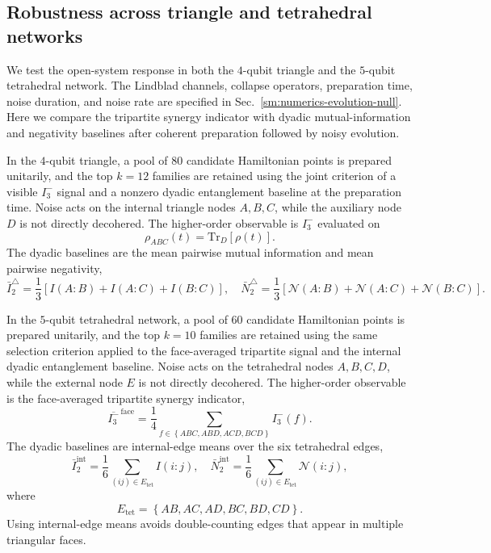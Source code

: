 \documentclass[aps,physrev,preprint,groupedaddress]{revtex4-2}
\begin{document}
\subsection{Robustness across triangle and tetrahedral networks}\label{sm:open-system-geometries}
We test the open-system response in both the $4$-qubit triangle and the $5$-qubit tetrahedral network. The Lindblad channels, collapse operators, preparation time, noise duration, and noise rate are specified in Sec.~\ref{sm:numerics-evolution-null}. Here we compare the tripartite synergy indicator with dyadic mutual-information and negativity baselines after coherent preparation followed by noisy evolution.

In the $4$-qubit triangle, a pool of $80$ candidate Hamiltonian points is prepared unitarily, and the top $k=12$ families are retained using the joint criterion of a visible $I_3^-$ signal and a nonzero dyadic entanglement baseline at the preparation time. Noise acts on the internal triangle nodes $A,B,C$, while the auxiliary node $D$ is not directly decohered. The higher-order observable is $I_3^-$ evaluated on
\begin{equation}
    \rho_{ABC}(t)={\mathrm{Tr}}_D[\rho(t)].
\end{equation}
The dyadic baselines are the mean pairwise mutual information and mean pairwise negativity,
\begin{equation}
    \bar{I}_2^{\triangle} = \frac{1}{3}[I(A:B)+I(A:C)+I(B:C)],
    \quad
    \bar{N}_2^{\triangle} = \frac{1}{3}[\mathcal{N}(A:B)+\mathcal{N}(A:C)+\mathcal{N}(B:C)].
\end{equation}

In the $5$-qubit tetrahedral network, a pool of $60$ candidate Hamiltonian points is prepared unitarily, and the top $k=10$ families are retained using the same selection criterion applied to the face-averaged tripartite signal and the internal dyadic entanglement baseline. Noise acts on the tetrahedral nodes $A,B,C,D$, while the external node $E$ is not directly decohered. The higher-order observable is the face-averaged tripartite synergy indicator,
\begin{equation}
    \overline{I_3^-}^{\,{\mathrm{face}}} = 
    \frac{1}{4}\sum_{f\in\left\{ABC,ABD,ACD,BCD\right\}}I_3^-(f).
\end{equation}
The dyadic baselines are internal-edge means over the six tetrahedral edges,
\begin{equation}
    \bar{I}_2^{\mathrm{int}}=\frac{1}{6}\sum_{(ij)\in E_{\mathrm{tet}}} I(i:j), \quad
    \bar{N}_2^{\mathrm{int}}=\frac{1}{6}\sum_{(ij)\in E_{\mathrm{tet}}} \mathcal{N}(i:j),
\end{equation}
where
\begin{equation}
    E_{\mathrm{tet}}=\left\{AB,AC,AD,BC,BD,CD\right\}.
\end{equation}
Using internal-edge means avoids double-counting edges that appear in multiple triangular faces.
\end{document}
